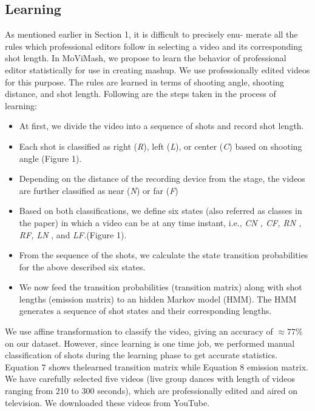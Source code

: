 \documentclass{sig-alternate}
\begin{document}
\subsection{Learning}
As mentioned earlier in Section 1, it is difficult to precisely enu-
merate all the rules which professional editors follow in selecting a video and its corresponding shot length. In MoViMash, we propose to learn the behavior of professional editor statistically for use in creating mashup. We use professionally edited videos for this purpose. The rules are learned in terms of shooting angle, shooting distance, and shot length. Following are the steps taken in the process of learning:

\begin{itemize}
    \item At first, we divide the video into a sequence of shots and record shot length.
    \item Each shot is classified as right (\textit{R}), left (\textit{L}), or center (\textit{C}) based on shooting angle (Figure 1).
    \item Depending on the distance of the recording device from the stage, the videos are further classified as near (\textit{N}) or far (\textit{F})
    \item Based on both classifications, we define six states (also referred as classes in the paper) in which a video can be at any time instant, i.e., \textit{CN , CF, RN , RF, LN} , and\textit{ LF.}(Figure 1).
    \item From the sequence of the shots, we calculate the state transition probabilities for the above described six states.
    \item We now feed the transition probabilities (transition matrix) along with shot lengths (emission matrix) to an hidden Markov model (HMM). The HMM generates a sequence of shot states and their corresponding lengths.
    
    
    
\end{itemize}

We use affine transformation to classify the video, giving an accuracy of  $ \approx 77\% $ on our dataset. However, since learning is one time job, we performed manual classification of shots during the learning phase to get accurate statistics. Equation 7 shows thelearned transition matrix while Equation 8 emission matrix. We have carefully selected five videos (live group dances with length of videos ranging from 210 to 300 seconds), which are professionally edited and aired on television. We downloaded these videos from YouTube.
\end{document}
